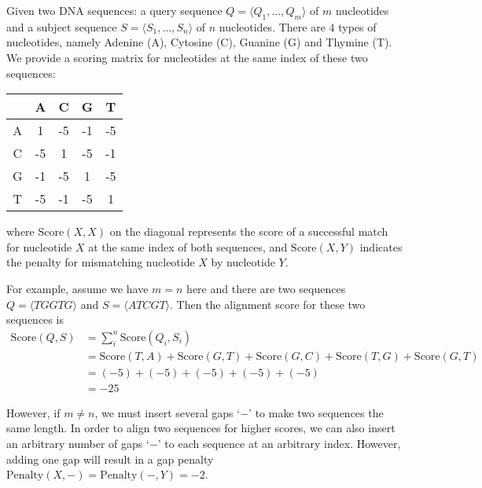 
\newcommand{\maxt}[3]{\max\begin{cases}#1\\#2\\#3\end{cases}}

Given two DNA sequences: a query sequence $Q=\langle Q_1, \dots, Q_m\rangle$ of $m$ nucleotides and a subject sequence $S=\langle S_1, \dots, S_n\rangle$ of $n$ nucleotides. There are $4$ types of nucleotides, namely Adenine (A), Cytosine (C), Guanine (G) and Thymine (T). We provide a scoring matrix for nucleotides at the same index of these two sequences:


\begin{table}[!htbp]
	\centering
	\begin{tabular}{|c|c|c|c|c|} \hline
		  & A  & C  & G  & T  \\ \hline
		A & 1  & -5 & -1 & -5 \\ \hline
		C & -5 & 1  & -5 & -1 \\ \hline
		G & -1 & -5 & 1  & -5 \\ \hline
		T & -5 & -1 & -5 & 1  \\ \hline
	\end{tabular}
\end{table}


where $\text{Score}(X, X)$ on the diagonal represents the score of a successful match for nucleotide $X$ at the same index of both sequences, and  $\text{Score}(X, Y)$ indicates the penalty for mismatching nucleotide $X$ by nucleotide $Y$.


For example, assume we have $m=n$ here and there are two sequences $Q=\langle TGGTG\rangle$ and $S=\langle ATCGT\rangle$. Then the alignment score for these two sequences is
\[
	\begin{aligned}
		\text{Score}(Q, S) & = \sum_{i}^{n} \text{Score}(Q_i, S_i) \\
		                   & = \text{Score}(T, A)+\text{Score}(G, T)+\text{Score}(G, C)+\text{Score}(T, G)+\text{Score}(G, T) \\
		                   & = (-5)+(-5)+(-5)+(-5)+(-5) \\
		                   & = -25
	\end{aligned}
\]


However, if $m \neq n$, we must insert several gaps `$-$' to make two sequences the same length. In order to align two sequences for higher scores, we can also insert an arbitrary number of gaps `$-$' to each sequence at an arbitrary index. However, adding one gap will result in a gap penalty $\text{Penalty}(X, -)=\text{Penalty}(-, Y)=-2$.


